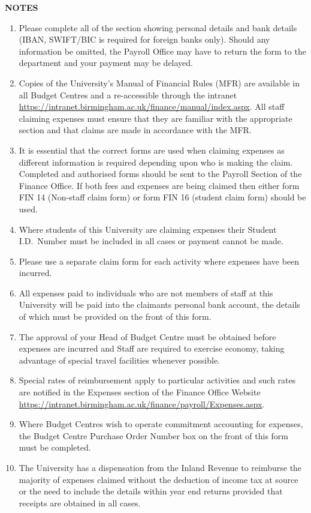 \documentclass{article}
\begin{document}
\newpage

\textbf{NOTES}\\
\begin{enumerate}
\item Please complete all of the section showing personal details
  and bank details (IBAN, SWIFT/BIC is required for foreign banks
  only). Should any information be omitted, the Payroll Office may
  have to return the form to the department and your payment may be
  delayed.

\item Copies of the University's Manual of Financial Rules
  (MFR) are available in all Budget Centres and a re-accessible
  through the intranet \url{https://intranet.birmingham.ac.uk/finance/manual/index.aspx}. All
  staff claiming expenses must ensure that they are familiar with the
  appropriate section and that claims are made in accordance with the
  MFR.
\item It is essential that the correct forms are used when
  claiming expenses as different information is required depending
  upon who is making the claim. Completed and authorised forms should
  be sent to the Payroll Section of the Finance Office. If both fees
  and expenses are being claimed then either form FIN 14 (Non-staff
  claim form) or form FIN 16 (student claim form) should be used.
\item Where students of this University are claiming expenses their
  Student I.D.\ Number must be included in all cases or payment cannot
  be made.
\item Please use a separate claim form for each activity where
  expenses have been incurred.
\item All expenses paid to individuals who are not members of staff at this University will be paid into
  the claimants personal bank account, the details of which must be
  provided on the front of this form.
\item The approval of your Head of Budget Centre must be obtained
  before expenses are incurred and Staff are required to exercise
  economy, taking advantage of special travel facilities whenever
  possible.
\item Special rates of reimbursement apply to particular activities
  and such rates are notified in the Expenses section of the Finance
  Office Website
  \url{https://intranet.birmingham.ac.uk/finance/payroll/Expenses.aspx}.
\item Where Budget Centres wish to operate commitment accounting for
  expenses, the Budget Centre Purchase Order Number box on the front
  of this form must be completed.
\item The University has a dispensation from the Inland Revenue
  to reimburse the majority of expenses claimed without the deduction
  of income tax at source or the need to include the details within
  year end returns provided that receipts are obtained in all cases.
\end{enumerate}
\end{document}
